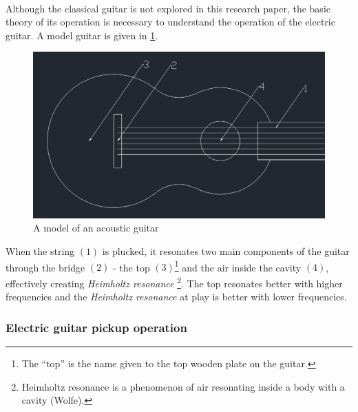 \documentclass{article}
\begin{document}
\paragraph*{}
Although the classical guitar is not explored in this research paper, the basic
theory of its operation is necessary to understand the operation of the 
electric guitar. A model guitar is given in \ref{fig:ac-guitar}.
\begin{figure}[ht]
	\centering
	\includegraphics[width=.5\textwidth]{img/ac-guitar}
	\caption{A model of an acoustic guitar}
	\label{fig:ac-guitar}
\end{figure}
When the string $(1)$ is plucked, it resonates two main components of the 
guitar through the bridge $(2)$ - the top $(3)$\footnote{The ``top'' is the 
name given to the top wooden plate on the guitar.} and the air inside the 
cavity $(4)$, effectively creating \textit{Heimholtz resonance}
\footnote{Heimholtz resonance is a phenomenon of air resonating inside a body 
	with a cavity (Wolfe).}. The top resonates better with higher frequencies 
and the \textit{Heimholtz resonance} at play is better with lower frequencies.

\subsubsection{Electric guitar pickup operation}
\end{document}
